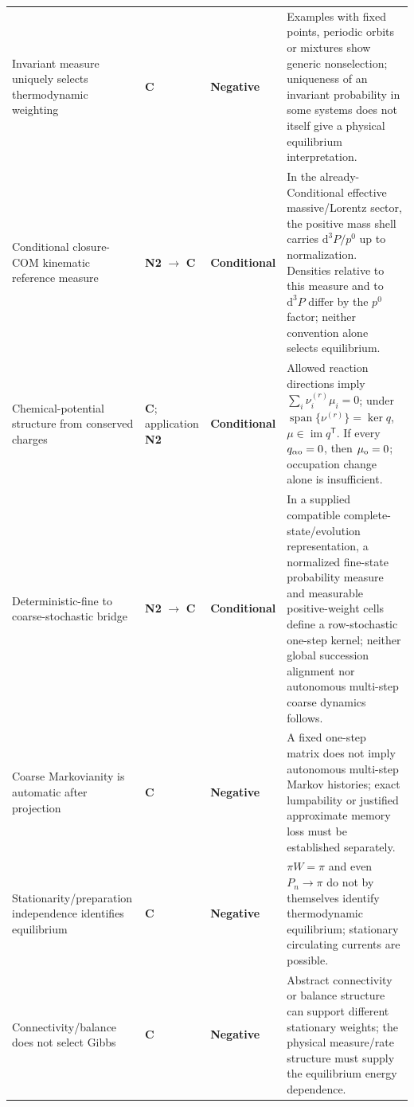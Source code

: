 \documentclass[11pt]{article}
\theoremstyle{definition}
\newcommand{\dd}{\mathrm{d}}
\newcommand{\statusConditional}{\textcolor{yellow!60!black}{\textbf{Conditional}}}
\newcommand{\statusNegative}{\textcolor{red!65!black}{\textbf{Negative}}}
\newcommand{\natNTwo}{\textcolor{teal!70!black}{\textbf{N2}}}
\newcommand{\natControl}{\textcolor{gray!75!black}{\textbf{C}}}
\begin{document}
\begin{center}
\begin{longtable}{@{}P{3.5cm}P{1.7cm}P{2.5cm}P{5.6cm}@{}}
Invariant measure uniquely selects thermodynamic weighting
& \natControl{} & \statusNegative{}
& Examples with fixed points, periodic orbits or mixtures show generic nonselection; uniqueness of an invariant probability in some systems does not itself give a physical equilibrium interpretation. \\
Conditional closure-COM kinematic reference measure
& \natNTwo{} $\to$ \natControl{} & \statusConditional{}
& In the already-Conditional effective massive/Lorentz sector, the positive mass shell carries $\dd^3P/p^0$ up to normalization.  Densities relative to this measure and to $\dd^3P$ differ by the $p^0$ factor; neither convention alone selects equilibrium. \\
Chemical-potential structure from conserved charges
& \natControl{}; application \natNTwo{} & \statusConditional{}
& Allowed reaction directions imply $\sum_i\nu_i^{(r)}\mu_i=0$; under $\operatorname{span}\{\nu^{(r)}\}=\ker q$, $\mu\in\operatorname{im}q^{\mathsf T}$. If every $q_{\alpha{\rm o}}=0$, then $\mu_{\rm o}=0$; occupation change alone is insufficient. \\
Deterministic-fine to coarse-stochastic bridge
& \natNTwo{} $\to$ \natControl{} & \statusConditional{}
& In a supplied compatible complete-state/evolution representation, a normalized fine-state probability measure and measurable positive-weight cells define a row-stochastic one-step kernel; neither global succession alignment nor autonomous multi-step coarse dynamics follows. \\
Coarse Markovianity is automatic after projection
& \natControl{} & \statusNegative{}
& A fixed one-step matrix does not imply autonomous multi-step Markov histories; exact lumpability or justified approximate memory loss must be established separately. \\
Stationarity/preparation independence identifies equilibrium
& \natControl{} & \statusNegative{}
& $\pi W=\pi$ and even $P_n\to\pi$ do not by themselves identify thermodynamic equilibrium; stationary circulating currents are possible. \\
Connectivity/balance does not select Gibbs
& \natControl{} & \statusNegative{}
& Abstract connectivity or balance structure can support different stationary weights; the physical measure/rate structure must supply the equilibrium energy dependence. \\


\end{longtable}
\end{center}
\end{document}

